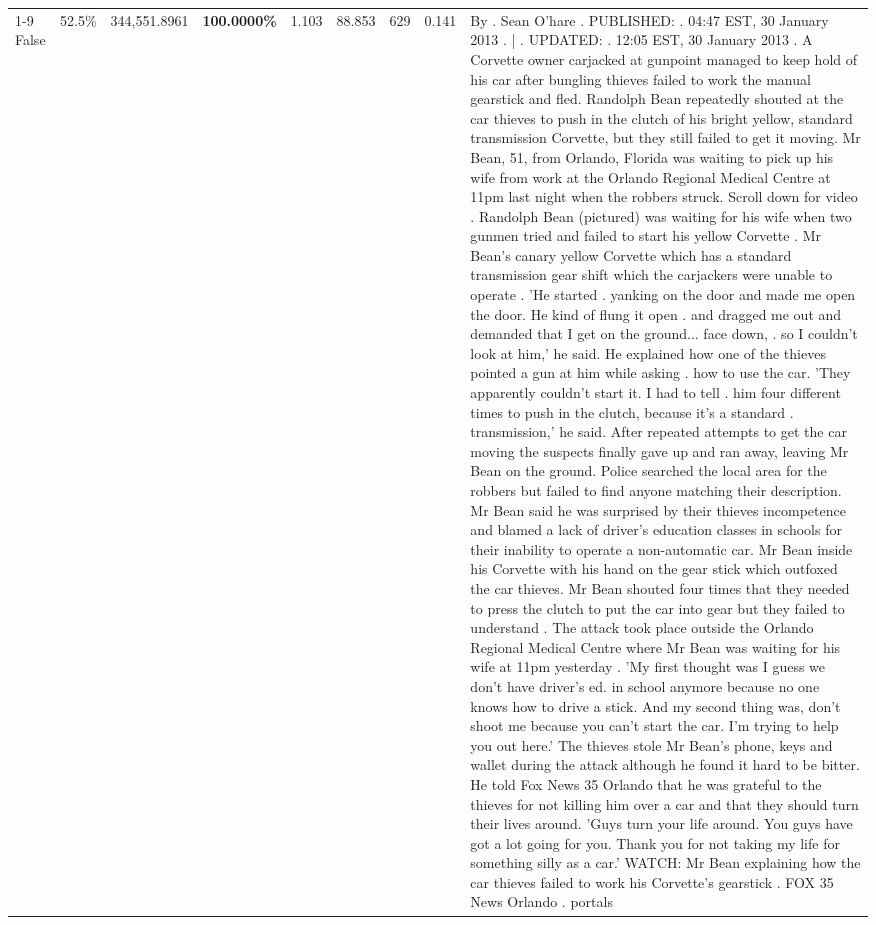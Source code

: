 \begin{table}[H]
\begin{tabular}{lllrlllll}
\cline{1-9} \cline{2-9}
False & 52.5\% & 344,551.8961 & \bfseries \color{red} 100.0000\% & 1.103 & 88.853 & 629 & 0.141 & By . Sean O'hare . PUBLISHED: . 04:47 EST, 30 January 2013 . | . UPDATED: . 12:05 EST, 30 January 2013 . A Corvette owner carjacked at gunpoint managed to keep hold of his car after bungling thieves failed to work the manual gearstick and fled. Randolph Bean repeatedly shouted at the car thieves to push in the clutch of his bright yellow, standard transmission Corvette, but they still failed to get it moving. Mr Bean, 51, from Orlando, Florida was waiting to pick up his wife from work at the Orlando Regional Medical Centre at 11pm last night when the robbers struck. Scroll down for video . Randolph Bean (pictured) was waiting for his wife when two gunmen tried and failed to start his yellow Corvette . Mr Bean's canary yellow Corvette which has a standard transmission gear shift which the carjackers were unable to operate . 'He started . yanking on the door and made me open the door. He kind of flung it open . and dragged me out and demanded that I get on the ground... face down, . so I couldn't look at him,' he said. He explained how one of the thieves pointed a gun at him while asking . how to use the car. 'They apparently couldn't start it. I had to tell . him four different times to push in the clutch, because it's a standard . transmission,' he said. After repeated attempts to get the car moving the suspects finally gave up and ran away, leaving Mr Bean on the ground. Police searched the local area for the robbers but failed to find anyone matching their description. Mr Bean said he was surprised by their thieves incompetence and blamed a lack of driver's education classes in schools for their inability to operate a non-automatic car. Mr Bean inside his Corvette with his hand on the gear stick which outfoxed the car thieves. Mr Bean shouted four times that they needed to press the clutch to put the car into gear but they failed to understand . The attack took place outside the Orlando Regional Medical Centre where Mr Bean was waiting for his wife at 11pm yesterday . 'My first thought was I guess we don't have driver's ed. in school anymore because no one knows how to drive a stick. And my second thing was, don't shoot me because you can't start the car. I'm trying to help you out here.' The thieves stole Mr Bean's phone, keys and wallet during the attack although he found it hard to be bitter. He told Fox News 35 Orlando that he was grateful to the thieves for not killing him over a car and that they should turn their lives around. 'Guys turn your life around. You guys have got a lot going for you. Thank you for not taking my life for something silly as a car.' WATCH: Mr Bean explaining how the car thieves failed to work his Corvette's gearstick . FOX 35 News Orlando . portals \\

\end{tabular}
\end{table}
